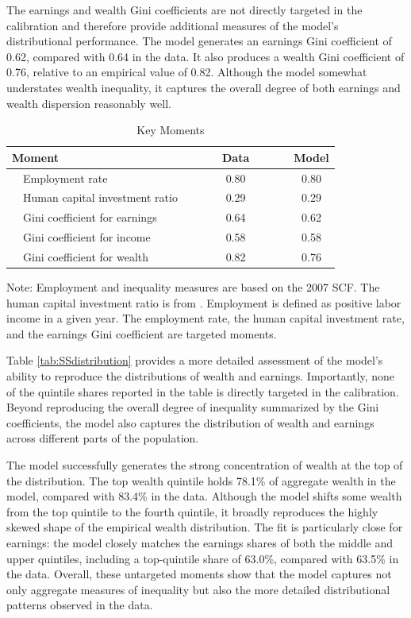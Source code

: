 \documentclass[12pt,english]{article}
\numberwithin{equation}{section}
\begin{document}
The earnings and wealth Gini coefficients are not directly targeted in the calibration and therefore provide additional measures of the model's distributional performance. The model generates an earnings Gini coefficient of 0.62, compared with 0.64 in the data. It also produces a wealth Gini coefficient of 0.76, relative to an empirical value of 0.82. Although the model somewhat understates wealth inequality, it captures the overall degree of both earnings and wealth dispersion reasonably well.

\begin{table}
    \caption{\protect\label{tbl:moments}Key Moments}
    
    \begin{centering}
    \begin{tabular}{lccccrrrc}
    \hline 
    Moment  &  &  &  & Data  &  &  &  & Model\tabularnewline
    \hline 
    ~~Employment rate  &  &  &  & 0.80  &  &  &  & 0.80\tabularnewline
    ~~Human capital investment ratio  &  &  &  & 0.29  &  &  &  & 0.29\tabularnewline
    ~~Gini coefficient for earnings  &  &  &  & 0.64  &  &  &  & 0.62\tabularnewline
    ~~Gini coefficient for income  &  &  &  & 0.58  &  &  &  & 0.58\tabularnewline
    ~~Gini coefficient for wealth  &  &  &  & 0.82  &  &  &  & 0.76\tabularnewline
    \hline 
    \end{tabular}
    \par\end{centering}
    {\scriptsize Note: Employment and inequality measures are based on the 2007 SCF. The human capital investment ratio is from \citet{oecd2025adultlearning}. Employment is defined as positive labor income in a given year. The employment rate, the human capital investment rate, and the earnings Gini coefficient are targeted moments.}{\scriptsize\par}
    \end{table}

Table \ref{tab:SSdistribution} provides a more detailed assessment of the
model's ability to reproduce the distributions of wealth and earnings.
Importantly, none of the quintile shares reported in the table is directly
targeted in the calibration. Beyond reproducing the overall degree of
inequality summarized by the Gini coefficients, the model also captures the
distribution of wealth and earnings across different parts of the population.

The model successfully generates the strong concentration of wealth at the top
of the distribution. The top wealth quintile holds 78.1\% of aggregate wealth
in the model, compared with 83.4\% in the data. Although the model shifts some
wealth from the top quintile to the fourth quintile, it broadly reproduces the
highly skewed shape of the empirical wealth distribution. The fit is
particularly close for earnings: the model closely matches the earnings shares
of both the middle and upper quintiles, including a top-quintile share of
63.0\%, compared with 63.5\% in the data. Overall, these untargeted moments show
that the model captures not only aggregate measures of inequality but also the
more detailed distributional patterns observed in the data.
\end{document}
